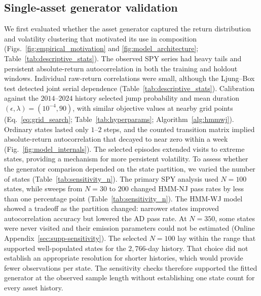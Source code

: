 \subsection{Single-asset generator validation}

We first evaluated whether the asset generator captured the return
distribution and volatility clustering that motivated its use in
composition (Figs.~\ref{fig:empirical_motivation} and
\ref{fig:model_architecture}; Table~\ref{tab:descriptive_stats}). The observed SPY series had heavy tails
and persistent absolute-return autocorrelation in both the training
and holdout windows. Individual raw-return correlations were small,
although the Ljung--Box test detected joint serial dependence
(Table~\ref{tab:descriptive_stats}). Calibration against the
$2014$--$2024$ history selected jump probability and mean duration
$(\epsilon,\lambda)=(10^{-4},90)$, with similar objective values at
nearby grid points (Eq.~\eqref{eq:grid_search};
Table~\ref{tab:hyperparams}; Algorithm~\ref{alg:hmmwj}). Ordinary
states lasted only $1$--$2$ steps, and the counted transition matrix
implied absolute-return autocorrelation that decayed to near zero
within a week (Fig.~\ref{fig:model_internals}). The selected episodes
extended visits to extreme states, providing a mechanism for more
persistent volatility.
To assess whether the generator comparison depended on the state
partition, we varied the number of states
(Table~\ref{tab:sensitivity_n}). The primary SPY analysis used $N=100$ states, while
sweeps from $N=30$ to $200$ changed HMM-NJ pass rates by less than
one percentage point (Table~\ref{tab:sensitivity_n}). The HMM-WJ
model showed a tradeoff as the partition changed: narrower states
improved autocorrelation accuracy but lowered the AD pass rate.
At $N=350$, some states were never visited and their emission
parameters could not be estimated
(Online Appendix~\ref{sec:supp-sensitivity}). The selected
$N=100$ lay within the range that supported well-populated states
for the $2{,}766$-day history. That choice did not establish an
appropriate resolution for shorter histories, which would provide
fewer observations per state. The sensitivity checks therefore
supported the fitted generator at the observed sample length without
establishing one state count for every asset history.


